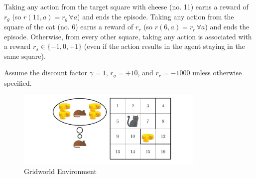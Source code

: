 \documentclass[a3paper,12pt]{extarticle} %
\begin{document}
Taking any action from the target square with cheese (no. 11) earns a reward of $r_g$ (so $r(11, a) = r_g \, \forall a$) and ends the episode. Taking any action from the square of the cat (no. 6) earns a reward of $r_r$ (so $r(6, a) = r_r \, \forall a$) and ends the episode. Otherwise, from every other square, taking any action is associated with a reward $r_s \in \{-1, 0, +1\}$ (even if the action results in the agent staying in the same square). 

Assume the discount factor $\gamma = 1$, $r_g = +10$, and $r_r = -1000$ unless otherwise specified.

\begin{figure}[H]
\centering
\includegraphics[width=0.8\textwidth]{grid.jpg}
\caption{Gridworld Environment}
\label{fig:gridworld}
\end{figure}
\end{document}
